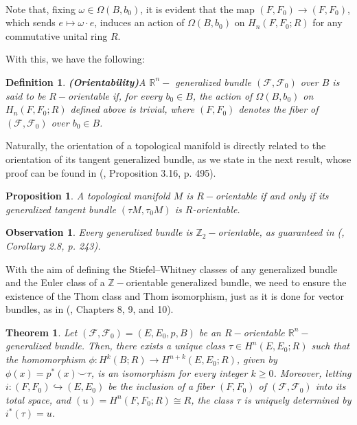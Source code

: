 \documentclass[12pt,oneside]{book}
\newtheorem{defi}   {Definition}[chapter]
\newtheorem{teo}    {Theorem}[chapter]
\newtheorem{prop}   {Proposition}[chapter]
\newtheorem{obs}    {Observation}[chapter]
\newcommand{\R}{\mathbb{R}}
\newcommand{\Z}{\mathbb{Z}}
\newcommand{\ccup}{\smile}
\begin{document}
    \

    Note that, fixing $\omega\in \Omega(B,b_{0})$, it is evident that the map $(F,F_{0})\to (F,F_{0})$, which sends $e\mapsto \omega\cdot e$, 
    induces an action of $\Omega(B,b_{0})$ on $H_{n}(F,F_{0};R)$ for any commutative unital ring $R$.

    With this, we have the following:

    \begin{defi}{\bf (Orientability)}\label{defi_orient}
    	A $\R^{n}-$ generalized bundle $(\mathcal{F},\mathcal{F}_{0})$ over $B$ is said to be 
        $R-$orientable if, for every $b_{0}\in B$, the action of $\Omega(B,b_{0})$ on $H_{n}(F,F_{0};R)$ 
        defined above is trivial, where $(F,F_{0})$ denotes the fiber of $(\mathcal{F},\mathcal{F}_{0})$ over $b_{0}\in B$.
    \end{defi}

    Naturally, the orientation of a topological manifold is directly related to the orientation of its tangent 
    generalized bundle, as we state in the next result, whose proof can be found in 
    (\cite{fadell_1}, Proposition 3.16, p. 495).

    \begin{prop}\label{propriedade_orient_var}
    	A topological manifold $M$ is $R-$orientable if and only if its generalized tangent bundle $(\tau M,\tau_{0}M)$ is $R$-orientable.
    \end{prop}

    \begin{obs}
    	Every generalized bundle is $\Z_{2}-$orientable, as guaranteed in (\cite{allaud}, Corollary 2.8, p. 243).
    \end{obs}

    With the aim of defining the Stiefel–Whitney classes of any generalized bundle and the 
    Euler class of a $\Z-$orientable generalized bundle, we need to ensure the existence of the Thom class and Thom 
    isomorphism, just as it is done for vector bundles, as in (\cite{milnor_1}, Chapters 8, 9, and 10).

    \begin{teo}\label{teo_iso_thom_fht}
    	Let $(\mathcal{F},\mathcal{F}_{0})=(E,E_{0},p,B)$ be an $R-$orientable $\R^{n}-$ generalized bundle. Then, there exists a unique class 
        $\tau\in H^{n}(E,E_{0};R)$ such that the homomorphism $\phi:H^{k}(B;R)\to H^{n+k}(E,E_{0};R)$, given by $\phi(x)=p^{*}(x)\ccup \tau$, 
        is an isomorphism for every integer $k\geq 0$. Moreover, letting $i:(F,F_{0})\hookrightarrow (E,E_{0})$ be the inclusion of a fiber 
        $(F,F_{0})$ of $(\mathcal{F},\mathcal{F}_{0})$ into its total space, and $(u)=H^{n}(F,F_{0};R)\cong R$, the class $\tau$ is uniquely 
        determined by $i^{*}(\tau)=u$.
    \end{teo}
\end{document}
